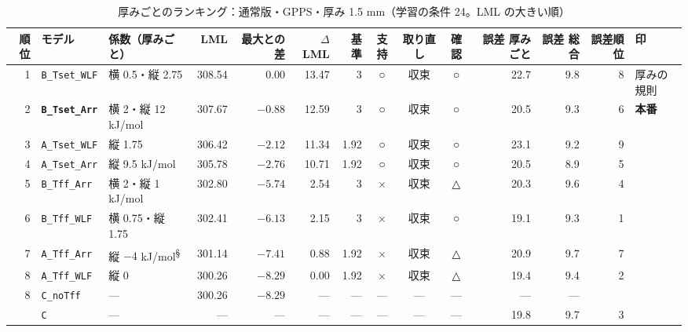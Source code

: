 \documentclass[paper=a4paper,landscape,fontsize=10pt,line_length=62zw,number_of_lines=34]{jlreq}
\let\origtextbf\textbf
\renewcommand{\textbf}[1]{\origtextbf{\gtfamily #1}}   %
\begin{document}
\begin{table}[H]\centering\footnotesize
\caption{厚みごとのランキング：通常版・GPPS・厚み 1.5 mm（学習の条件 24。LML の大きい順）}
\begin{tabular}{rlp{11\zw}rrrrccc rrrl}
\toprule
順位 & モデル & 係数（厚みごと） & LML & 最大との差 & $\Delta$LML & 基準 & 支持 & 取り直し & 確認 & 誤差 厚みごと & 誤差 総合 & 誤差順位 & 印 \\
\midrule
1 & \texttt{B\_\allowbreak{}Tset\_\allowbreak{}WLF} & 横 0.5・縦 2.75 & 308.54 & 0.00 & 13.47 & 3 & ○ & 収束 & ○ & 22.7 & 9.8 & 8 & 厚みの規則 \\
2 & \textbf{\texttt{B\_\allowbreak{}Tset\_\allowbreak{}Arr}} & 横 2・縦 12 kJ/mol & 307.67 & $-0.88$ & 12.59 & 3 & ○ & 収束 & ○ & 20.5 & 9.3 & 6 & \textbf{本番} \\
3 & \texttt{A\_\allowbreak{}Tset\_\allowbreak{}WLF} & 縦 1.75 & 306.42 & $-2.12$ & 11.34 & 1.92 & ○ & 収束 & ○ & 23.1 & 9.2 & 9 &  \\
4 & \texttt{A\_\allowbreak{}Tset\_\allowbreak{}Arr} & 縦 9.5 kJ/mol & 305.78 & $-2.76$ & 10.71 & 1.92 & ○ & 収束 & ○ & 20.5 & 8.9 & 5 &  \\
5 & \texttt{B\_\allowbreak{}Tff\_\allowbreak{}Arr} & 横 2・縦 1 kJ/mol & 302.80 & $-5.74$ & 2.54 & 3 & × & 収束 & △ & 20.3 & 9.6 & 4 &  \\
6 & \texttt{B\_\allowbreak{}Tff\_\allowbreak{}WLF} & 横 0.75・縦 1.75 & 302.41 & $-6.13$ & 2.15 & 3 & × & 収束 & ○ & 19.1 & 9.3 & 1 &  \\
7 & \texttt{A\_\allowbreak{}Tff\_\allowbreak{}Arr} & 縦 $-4$ kJ/mol\textsuperscript{§} & 301.14 & $-7.41$ & 0.88 & 1.92 & × & 収束 & △ & 20.9 & 9.7 & 7 &  \\
8 & \texttt{A\_\allowbreak{}Tff\_\allowbreak{}WLF} & 縦 0 & 300.26 & $-8.29$ & 0.00 & 1.92 & × & 収束 & △ & 19.4 & 9.4 & 2 &  \\
8 & \texttt{C\_\allowbreak{}noTff} & --- & 300.26 & $-8.29$ & --- & --- & --- & --- & --- & --- & --- &  &  \\
 & \texttt{C} & --- & --- & --- & --- & --- & --- & --- & --- & 19.8 & 9.7 & 3 &  \\
\bottomrule
\end{tabular}
\end{table}
\end{document}
